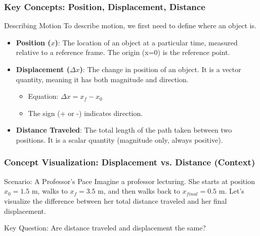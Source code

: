 \documentclass{beamer}
\begin{document}
\begin{frame}
\frametitle{Key Concepts: Position, Displacement, Distance}
\begin{block}{Describing Motion}
To describe motion, we first need to define where an object is.
\end{block}
\begin{itemize}
    \item \textbf{Position ($x$)}: The location of an object at a particular time, measured relative to a \alert{reference frame}. The origin (x=0) is the reference point.
    \item \textbf{Displacement ($\Delta x$)}: The change in position of an object. It is a \alert{vector} quantity, meaning it has both magnitude and direction.
    \begin{itemize}
        \item Equation: $\Delta x = x_f - x_0$
        \item The sign (+ or -) indicates direction.
    \end{itemize}
    \item \textbf{Distance Traveled}: The total length of the path taken between two positions. It is a \alert{scalar} quantity (magnitude only, always positive).
\end{itemize}
\end{frame}

\begin{frame}
\frametitle{Concept Visualization: Displacement vs. Distance (Context)}
\begin{block}{Scenario: A Professor's Pace}
Imagine a professor lecturing. She starts at position $x_0 = 1.5$ m, walks to $x_f = 3.5$ m, and then walks back to $x_{final} = 0.5$ m.
\bigskip
Let's visualize the difference between her total distance traveled and her final displacement.
\end{block}
\alert{Key Question}: Are distance traveled and displacement the same?
\end{frame}
\end{document}
